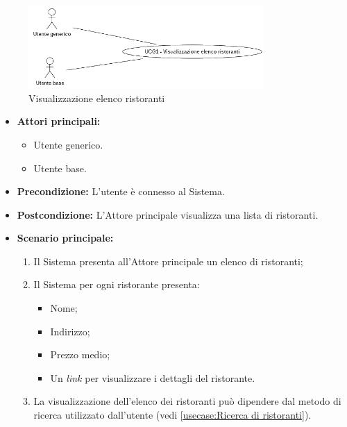 
\label{usecase:Visualizzazione elenco ristoranti}

\begin{figure}[h]
	\centering
	\includegraphics[width=0.8\textwidth]{./uml/UCG1.png} 
	\caption{Visualizzazione elenco ristoranti}
	\label{fig:UCG1}
  \end{figure}

\begin{itemize}
	\item \textbf{Attori principali:} 
	\begin{itemize}
		\item Utente generico.
		\item Utente base.
	\end{itemize}

	\item \textbf{Precondizione:}
	      L'utente è connesso al Sistema.

	\item \textbf{Postcondizione:} L'Attore principale visualizza una lista di
	      ristoranti.

	\item \textbf{Scenario principale:}
	      \begin{enumerate}

		      \item Il Sistema presenta all'Attore principale un elenco di ristoranti;
		      \item Il Sistema per ogni ristorante presenta:
		            \begin{itemize}
			            \item Nome;
			            \item Indirizzo;
			            \item Prezzo medio;
			            \item Un \textit{link} per visualizzare i dettagli del ristorante.
		            \end{itemize}
				\item La visualizzazione dell'elenco dei ristoranti può dipendere dal metodo di ricerca utilizzato dall'utente (vedi \autoref{usecase:Ricerca di ristoranti}).

	      \end{enumerate}
\end{itemize}

